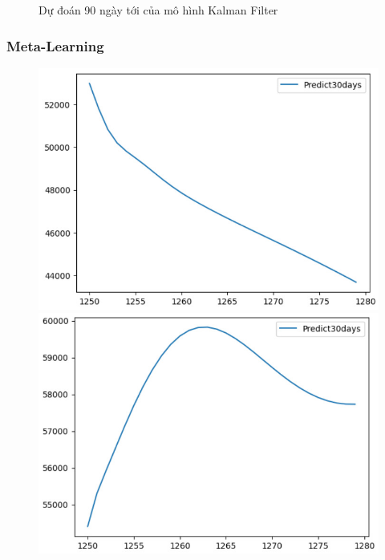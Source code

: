 \begin{figure}[H]
\begin{minipage}{0.15\textwidth}
    \end{minipage}
    \hfill
    
    \caption{Dự đoán 90 ngày tới của mô hình Kalman Filter}
    \label{fig:kalman_filter_30days}
\end{figure}



\subsubsection{Meta-Learning}
\begin{figure}[H]
    \centering
    \begin{minipage}{0.15\textwidth}
    \centering
    \includegraphics[width=1\textwidth]{resources/chapter-5/predicted/BIDV_LSTM_7_3_next30days.jpg}
    \end{minipage}
    \hfill
    \begin{minipage}{0.15\textwidth}
    \centering
    \includegraphics[width=1\textwidth]{resources/chapter-5/predicted/BIDV_LSTM_8_2_next30days.jpg}

\end{minipage}
\end{figure}
